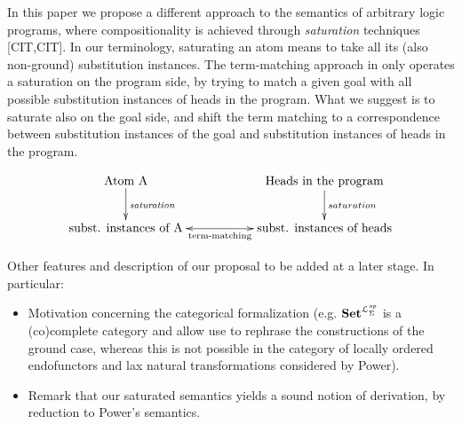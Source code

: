In this paper we propose a different approach to the semantics of arbitrary logic programs, where compositionality is achieved through \emph{saturation} techniques [CIT,CIT]. In our terminology, saturating an atom means to take all its (also non-ground) substitution instances. The term-matching approach in \cite{KomPowCALCO11} only operates a saturation on the program side, by trying to match a given goal with all possible substitution instances of heads in the program. What we suggest is to saturate also on the goal side, and shift the term matching to a correspondence between substitution instances of the goal and substitution instances of heads in the program.

 \begin{equation} \xymatrix{ \text{Atom A} \ar[d]^{\m{saturation}} & & \ar[d]^{saturation} \text{Heads in the program} \\
 \text{subst. instances of A} & & \ar@{<->}[ll]^-{\text{term-matching}} \text{subst. instances of heads} }\label{Eq:Draw_idea_saturation}
 \end{equation}

\begin{todo} Other features and description of our proposal to be added at a later stage. In particular:
 \begin{itemize}
   \item Motivation concerning the categorical formalization (e.g. $\mathbf{Set}^{\mathcal{L}^{\mathit{op}}_{\Sigma}}$ is a (co)complete category and allow use to rephrase the constructions of the ground case, whereas this is not possible in the category of locally ordered endofunctors and lax natural transformations considered by Power).
   \item Remark that our saturated semantics yields a sound notion of derivation, by reduction to Power's semantics.
 \end{itemize}
 \end{todo} 